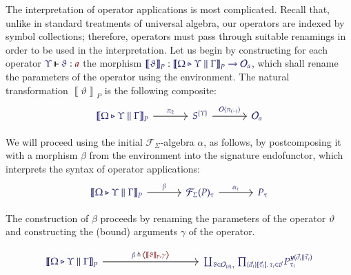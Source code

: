 \documentclass[11pt]{article}
\theoremstyle{definition}
\theoremstyle{remark}
\numberwithin{equation}{section}
\def\IModeColorName{MidnightBlue}
\def\OModeColorName{Maroon}
\newcommand\IMode[1]{{\color{\IModeColorName}{#1}}}
\newcommand\OMode[1]{{\color{\OModeColorName}{#1}}}
\newcommand\Of[2]{\IMode{#1}: \IMode{#2}}
\newcommand\MkValence[3]{%
  \ifthenelse{\equal{#1}{}}{}{%
    \{#1\}%
  }%
  \ifthenelse{\equal{#2}{}}{}{%
    [#2]%
  }.\, #3%
}
\newcommand\MkArity[2]{(#1)\, #2}
\newcommand\Operators{\mathcal{O}}
\newcommand\IsOperator[3]{
  \IMode{#1}\,{\Vdash}\,\IMode{#2}: \OMode{#3}
}
\newcommand\Tuple[1]{\left\langle#1 \right\rangle}
\newcommand\FLift[2]{
  \Operators\langle#1%
  \ifthenelse{\equal{#2}{}}{}{, #2}\rangle%
}
\newcommand\Define[2]{\IMode{#1}\triangleq\OMode{#2}}
\newcommand\SigFun[1]{\mathcal{F}_{#1}}
\newcommand\SemBrackets[1]{\left\llbracket#1\right\rrbracket}
\newcommand\Yoneda[1]{\boldsymbol{y} (#1)}
\begin{document}
The interpretation of operator applications is most complicated. Recall that,
unlike in standard treatments of universal algebra, our operators are indexed
by symbol collections; therefore, operators must pass through suitable
renamings in order to be used in the interpretation. Let us begin by
constructing for each operator $\IsOperator{\Upsilon}{\vartheta}{a}$ the
morphism
$\Of{\SemBrackets{\vartheta}_P}{\SemBrackets{\Omega\triangleright\Upsilon\parallel\Gamma}_P
\to\Operators_{a}}$, which shall rename the parameters of the operator using
the environment. The natural transformation $\SemBrackets{\vartheta}_P$ is the
following composite:
\[
  \begin{tikzcd}[ampersand replacement = \&, sep=large]
    {\IMode{\SemBrackets{\Omega\triangleright\Upsilon\parallel\Gamma}_P}} \arrow[r, "\IMode{\pi_2}"]
    \& {\IMode{S^{\{\Upsilon\}}}} \arrow[r, "\IMode{\FLift{\pi_{(-)}}{}}"]
    \& {\IMode{\Operators_a}}
  \end{tikzcd}
\]

We will proceed using the initial $\SigFun{\Sigma}$-algebra $\alpha$, as
follows, by postcomposing it with a morphism $\beta$ from the environment into
the signature endofunctor, which interprets the syntax of operator
applications:
\[
   \begin{tikzcd}[ampersand replacement = \&, sep=large]
     {\IMode{\SemBrackets{\Omega\triangleright\Upsilon\parallel\Gamma}_P}} \arrow[r, "\IMode{\beta}"]
     \& {\IMode{\SigFun{\Sigma}(P)_\tau}} \arrow[r, "\IMode{\alpha_\tau}"]
     \& {\IMode{P_\tau}}
   \end{tikzcd}
\]

The construction of $\beta$ proceeds by renaming the parameters of the operator
$\vartheta$ and constructing the (bound) arguments $\gamma$ of the operator.

\[
  \begin{tikzcd}[ampersand replacement = \&, sep=10em]
    {\IMode{\SemBrackets{\Omega\triangleright\Upsilon\parallel\Gamma}_P}}
       \arrow[r, "\Define{\beta\,}{\,\Tuple{\SemBrackets{\vartheta}_P, \gamma}}"]
    \& {\IMode{%
       \coprod_{\vartheta\in \Operators_{\MkArity{\vec{v}}{\tau}}}%
       \prod_{\MkValence{\vec{\sigma}_i}{\vec{\tau}_i}{\tau_i}\in\vec{v}}%
       P_{\tau_i}^{\Yoneda{\vec{\sigma}_i\parallel\vec{\tau}_i}}%
    }}
  \end{tikzcd}
\]
\end{document}
